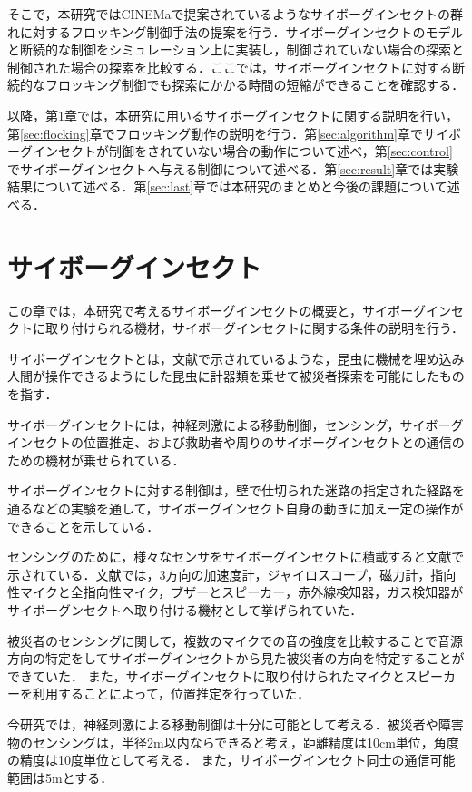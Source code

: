 \documentclass[a4paper,11pt]{jarticle}
\begin{document}
	そこで，本研究ではCINEMaで提案されているようなサイボーグインセクトの群れに対するフロッキング制御手法の提案を行う．サイボーグインセクトのモデルと断続的な制御をシミュレーション上に実装し，制御されていない場合の探索と制御された場合の探索を比較する．ここでは，サイボーグインセクトに対する断続的なフロッキング制御でも探索にかかる時間の短縮ができることを確認する．
	
	以降，第\ref{sec:CyborgInsect}章では，本研究に用いるサイボーグインセクトに関する説明を行い，第\ref{sec:flocking}章でフロッキング動作の説明を行う．第\ref{sec:algorithm}章でサイボーグインセクトが制御をされていない場合の動作について述べ，第\ref{sec:control}でサイボーグインセクトへ与える制御について述べる．第\ref{sec:result}章では実験結果について述べる．第\ref{sec:last}章では本研究のまとめと今後の課題について述べる．
	\section{サイボーグインセクト}
	\label{sec:CyborgInsect}
	この章では，本研究で考えるサイボーグインセクトの概要と，サイボーグインセクトに取り付けられる機材，サイボーグインセクトに関する条件の説明を行う．
	
	サイボーグインセクトとは，文献\cite{CyborgInsect}で示されているような，昆虫に機械を埋め込み人間が操作できるようにした昆虫に計器類を乗せて被災者探索を可能にしたものを指す．
	
	サイボーグインセクトには，神経刺激による移動制御，センシング，サイボーグインセクトの位置推定、および救助者や周りのサイボーグインセクトとの通信のための機材が乗せられている．
	
	サイボーグインセクトに対する制御は，壁で仕切られた迷路の指定された経路を通るなどの実験を通して，サイボーグインセクト自身の動きに加え一定の操作ができることを示している\cite{CINEMa}．
	
	センシングのために，様々なセンサをサイボーグインセクトに積載すると文献\cite{CINEMa}で示されている．文献\cite{CINEMa}では，3方向の加速度計，ジャイロスコープ，磁力計，指向性マイクと全指向性マイク，ブザーとスピーカー，赤外線検知器，ガス検知器がサイボーグンセクトへ取り付ける機材として挙げられていた．
	
	被災者のセンシングに関して，複数のマイクでの音の強度を比較することで音源方向の特定をしてサイボーグインセクトから見た被災者の方向を特定することができていた．
	また，サイボーグインセクトに取り付けられたマイクとスピーカーを利用することによって，位置推定を行っていた．
	
	今研究では，神経刺激による移動制御は十分に可能として考える．被災者や障害物のセンシングは，半径2m以内ならできると考え，距離精度は10cm単位，角度の精度は10度単位として考える．
	また，サイボーグインセクト同士の通信可能範囲は5mとする．
	
\end{document}
